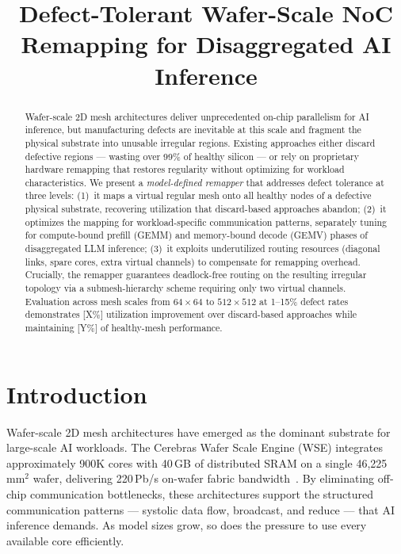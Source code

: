 \documentclass[sigplan,anonymous,review,nonacm]{acmart}
\begin{document}
\title{Defect-Tolerant Wafer-Scale NoC Remapping for Disaggregated AI Inference}



\begin{abstract}

Wafer-scale 2D mesh architectures deliver unprecedented on-chip parallelism for AI inference, but manufacturing defects are inevitable at this scale and fragment the physical substrate into unusable irregular regions. Existing approaches either discard defective regions --- wasting over 99\% of healthy silicon --- or rely on proprietary hardware remapping that restores regularity without optimizing for workload characteristics.
We present a \emph{model-defined remapper} that addresses defect tolerance at three levels:
(1)~it maps a virtual regular mesh onto all healthy nodes of a defective physical substrate, recovering utilization that discard-based approaches abandon;
(2)~it optimizes the mapping for workload-specific communication patterns, separately tuning for compute-bound prefill (GEMM) and memory-bound decode (GEMV) phases of disaggregated LLM inference;
(3)~it exploits underutilized routing resources (diagonal links, spare cores, extra virtual channels) to compensate for remapping overhead.
Crucially, the remapper guarantees deadlock-free routing on the resulting irregular topology via a submesh-hierarchy scheme requiring only two virtual channels.
Evaluation across mesh scales from $64 \times 64$ to $512 \times 512$ at 1--15\% defect rates demonstrates [X\%] utilization improvement over discard-based approaches while maintaining [Y\%] of healthy-mesh performance.

\end{abstract}

\maketitle

\section{Introduction}
\label{sec:intro}

Wafer-scale 2D mesh architectures have emerged as the dominant substrate for large-scale AI workloads. The Cerebras Wafer Scale Engine (WSE) integrates approximately 900K cores with 40\,GB of distributed SRAM on a single 46,225\,mm$^2$ wafer, delivering 220\,Pb/s on-wafer fabric bandwidth~\cite{lie2023cerebras}. By eliminating off-chip communication bottlenecks, these architectures support the structured communication patterns --- systolic data flow, broadcast, and reduce --- that AI inference demands. As model sizes grow, so does the pressure to use every available core efficiently.
\end{document}
